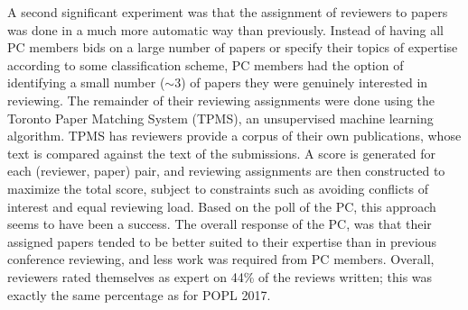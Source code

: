 A second significant experiment was that the assignment of
reviewers to papers was done in a much more automatic way than
previously. Instead of having all PC members bids on a large number
of papers or specify their topics of expertise according to some
classification scheme, PC members had the option of identifying a
small number ($\sim\!3$) of papers they were genuinely interested in
reviewing. The remainder of their reviewing assignments were done
using the Toronto Paper Matching System (TPMS), an unsupervised
machine learning algorithm. TPMS has reviewers
provide a corpus of their own publications, whose text is compared
against the text of the submissions. A score is generated for each
(reviewer, paper) pair, and reviewing assignments are then constructed
to maximize the total score, subject to constraints such as
avoiding conflicts of interest and equal reviewing load. Based on
the poll of the PC, this approach seems to have been a success.  The
overall response of the PC, was that their assigned papers tended
to be better suited to their expertise than in previous conference
reviewing, and less work was required from PC members. Overall,
reviewers rated themselves as expert on 44\% of the reviews written;
this was exactly the same percentage as for POPL 2017.


